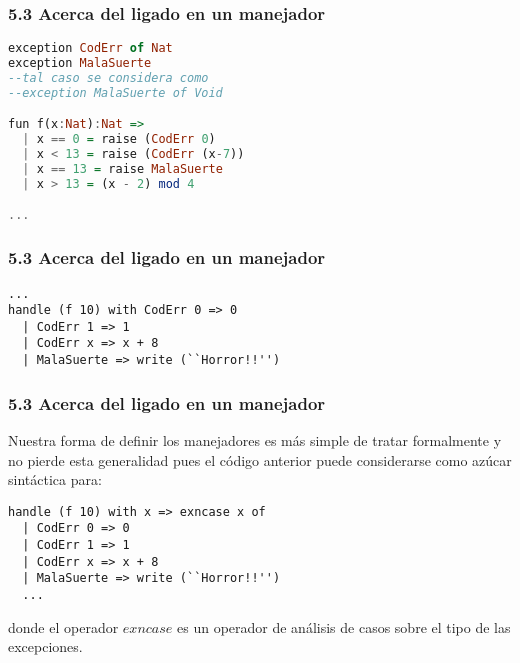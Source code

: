 \documentclass[xcolor=dvipsnames,table,spanish]{beamer}
\begin{document}
\begin{frame}[fragile]
\frametitle{5.3 Acerca del ligado en un manejador}
\begin{example}
\begin{lstlisting}[language=Haskell]
exception CodErr of Nat
exception MalaSuerte
--tal caso se considera como
--exception MalaSuerte of Void

fun f(x:Nat):Nat =>
  | x == 0 = raise (CodErr 0)
  | x < 13 = raise (CodErr (x-7))
  | x == 13 = raise MalaSuerte
  | x > 13 = (x - 2) mod 4

...
\end{lstlisting}
\end{example}
\end{frame}
\begin{frame}[fragile]
\frametitle{5.3 Acerca del ligado en un manejador}
\begin{example}
\begin{lstlisting}
...
handle (f 10) with CodErr 0 => 0
  | CodErr 1 => 1
  | CodErr x => x + 8
  | MalaSuerte => write (``Horror!!'')

\end{lstlisting}
\end{example}
\end{frame}
\begin{frame}[fragile]
\frametitle{5.3 Acerca del ligado en un manejador}
Nuestra forma de definir los manejadores es más simple de tratar formalmente y no pierde esta generalidad pues el código anterior puede considerarse como azúcar sintáctica para:
\begin{example}
\begin{lstlisting}
handle (f 10) with x => exncase x of
  | CodErr 0 => 0
  | CodErr 1 => 1
  | CodErr x => x + 8
  | MalaSuerte => write (``Horror!!'')
  ...
\end{lstlisting}
donde el operador $exncase$ es un operador de análisis de casos sobre el tipo de las excepciones.
\end{example}
\end{frame}
\end{document}
